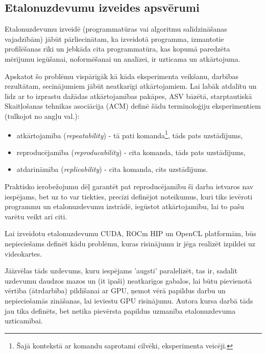 \begin{center}
    \chapter{Etalonuzdevumu izveides apsvērumi}
\end{center}

Etalonuzdevumu izveidē (programmatūras vai algoritmu salīdzināšanas vajadzībām)
jābūt pārliecinātam, ka izveidotā programma, izmantotie profilēšanas rīki un
jebkāda cita programmatūra, kas kopumā paredzēta mērījumu iegūšanai,
noformēšanai un analīzei, ir uzticama un atkārtojuma.

Apskatot šo problēmu vispārīgāk kā kāda eksperimenta veikšanu, darbības
rezultātam, secinājumiem jābūt neatkarīgi atkārtojamiem. Lai labāk atdalītu un
līdz ar to izprastu dažādas atkārtojamības pakāpes, ASV bāzētā, starptautiskā
Skaitļošanas tehnikas asociācija (ACM) definē šādu terminoloģiju eksperimentiem
(tulkojot no angļu val.):
\cite{acm-experiment-terms}

\begin{itemize}
    \item atkārtojamība (\textit{repeatability}) - tā pati komanda\footnote{Šajā
        kontekstā ar komandu saprotami cilvēki, eksperimenta veicēji.}, tāds
        pats uzstādījums,
    \item reproducējamība (\textit{reproducability}) - cita komanda, tāds pats
        uzstādījums,
    \item atdarināmība (\textit{replicability}) -  cita komanda, cits uzstādījums.
\end{itemize}


Praktisko ierobežojumu dēļ garantēt pat reproducējamību šī darba ietvaros nav
iespējams, bet uz to var tiekties, precīzi definējot noteikumus, kuri tiks
ievēroti programmu un etalonuzdevumu izstrādē, iegūstot atkārtojamību, lai
to pašu varētu veikt arī citi.

Lai izveidotu etalonuzdevumu CUDA, ROCm HIP un OpenCL platformām,
būs nepieciešams definēt kādu problēmu, kuras risinājumu ir jēga realizēt
izpildei uz videokartes.

Jāizvēlas tāds uzdevums, kuru iespējams 'augsti' paralelizēt, tas ir, sadalīt
uzdevumu daudzos mazos un (it īpaši) neatkarīgos gabalos, lai būtu pievienotā
vērtība (ātrdarbība) pildīšanai ar GPU, ņemot vērā papildus darbu un
nepieciešamās zināšanas, lai ieviestu GPU risinājumu. Autora kursa
darbā\cite{kursa-darbs} tāds jau tika definēts, bet netika pievērsta papildus
uzmanība etalonuzdevuma uzticamībai.

